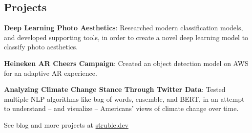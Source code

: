 \documentclass[margin]{res}
\begin{document}
\begin{resume}

	\section{Projects}
	\phantom{spacing}
	\par
	\textbf{Deep Learning Photo Aesthetics}:
	Researched modern classification models, and developed supporting tools, in order to create a novel deep learning model to classify photo aesthetics.

	\par
	\textbf{Heineken\textsuperscript{\textregistered} AR Cheers Campaign}:
	Created an object detection model on AWS for an adaptive AR experience.

	\par
	\textbf{Analyzing Climate Change Stance Through Twitter Data}:
	Tested multiple NLP algorithms like bag of words, ensemble, and BERT, in an attempt to understand -- and visualize -- Americans' views of climate change over time.

	\hfill See blog and more projects at \href{https://struble.dev}{struble.dev}



\end{resume}
\end{document}
